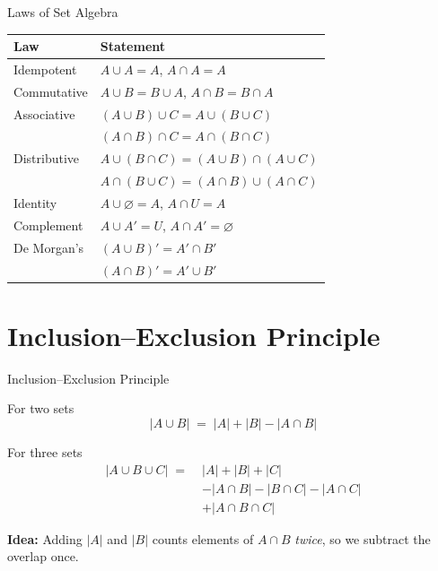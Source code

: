 \documentclass{beamer}
\begin{document}
\begin{frame}{Laws of Set Algebra}
  \small
  \begin{center}
    \begin{tabular}{l l}
      \hline
      \textbf{Law} & \textbf{Statement} \\ \hline
      Idempotent    & $A \cup A = A$, \quad $A \cap A = A$ \\
      Commutative   & $A \cup B = B \cup A$, \quad $A \cap B = B \cap A$ \\
      Associative   & $(A \cup B) \cup C = A \cup (B \cup C)$ \\
                    & $(A \cap B) \cap C = A \cap (B \cap C)$ \\
      Distributive  & $A \cup (B \cap C) = (A \cup B) \cap (A \cup C)$ \\
                    & $A \cap (B \cup C) = (A \cap B) \cup (A \cap C)$ \\
      Identity      & $A \cup \varnothing = A$, \quad $A \cap U = A$ \\
      Complement    & $A \cup A' = U$, \quad $A \cap A' = \varnothing$ \\
      De Morgan's   & $(A \cup B)' = A' \cap B'$ \\
                    & $(A \cap B)' = A' \cup B'$ \\ \hline
    \end{tabular}
  \end{center}
\end{frame}

\section{Inclusion--Exclusion Principle}
\begin{frame}{Inclusion--Exclusion Principle}
  \begin{block}{For two sets}
    \[
      |A \cup B| \;=\; |A| + |B| - |A \cap B|
    \]
  \end{block}
  \pause
  \begin{block}{For three sets}
    \begin{align*}
      |A \cup B \cup C| \;=\;& |A| + |B| + |C| \\
      &- |A \cap B| - |B \cap C| - |A \cap C| \\
      &+ |A \cap B \cap C|
    \end{align*}
  \end{block}
  \pause
  \textbf{Idea:} Adding $|A|$ and $|B|$ counts elements of
  $A \cap B$ \emph{twice}, so we subtract the overlap once.
\end{frame}
\end{document}
